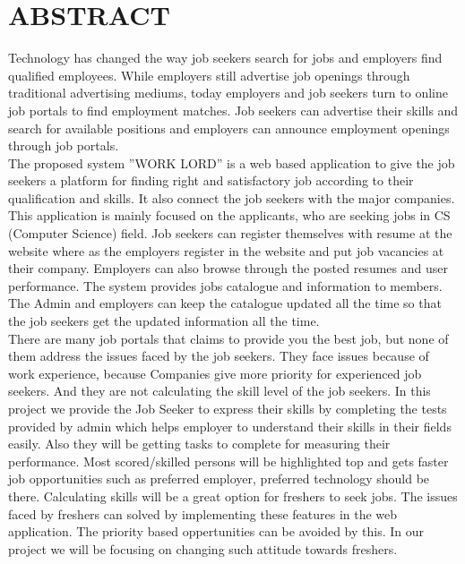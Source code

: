 \documentclass[a4paper,12pt]{report}
\begin{document}
\pagebreak

\section*{\centering \bf \large ABSTRACT}
\vspace*{20pt}
\par
\hspace*{12pt}Technology has changed the way job seekers search for jobs and employers
find qualified employees. While employers still advertise job openings through
traditional advertising mediums, today employers and job seekers turn to online
job portals to find employment matches. Job seekers can advertise their skills and
search for available positions and employers can announce employment openings
through job portals.\\

The proposed system ”WORK LORD” is a web based application to give the
job seekers a platform for finding right and satisfactory job according to their qualification and skills. It also connect the job seekers with the major companies. This application is mainly focused on the applicants, who are seeking jobs in CS (Computer
Science) field. Job seekers can register themselves with resume at the website where as the
employers register in the website and put job vacancies at their
company. Employers can also browse through the posted resumes and user performance. The system provides jobs catalogue and information to members. The Admin and employers can
keep the catalogue updated all the time so that the job seekers get the updated information all the time.\\

There are many job portals that claims to provide you the best job, but none
of them address the issues faced by the job seekers. They face issues because of work experience, because Companies give more priority for experienced job seekers. And they are not calculating the skill level of the job seekers. In this project we provide the Job Seeker to express their skills by completing the tests provided by admin which helps employer to understand their skills in their fields easily. Also they will
be getting tasks to complete for measuring their performance. Most
scored/skilled persons will be highlighted top and gets faster job opportunities such as preferred employer, preferred technology should be there. Calculating skills will be a great option for freshers to seek jobs. The issues faced by freshers can solved by implementing these features in the web application. The priority based oppertunities can be avoided by this. In our project we will be focusing on changing
such attitude towards freshers.\\
\end{document}
